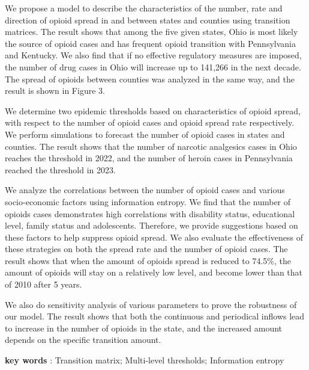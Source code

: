 \documentclass[13pt]{ctexart}
\begin{document}
\begin{adjustwidth}{1cm}{1cm}
\indent { }{ }{ }{ }{ }{ }We propose a model to describe the characteristics of the number, rate and direction of opioid spread in and between states and counties using transition matrices. The result shows that among the five given states, Ohio is most likely the source of opioid cases and has frequent opioid transition with Pennsylvania and Kentucky. We also find that if no effective regulatory measures are imposed, the number of drug cases in Ohio will increase up to 141,266 in the next decade. The spread of opioids between counties was analyzed in the same way, and the result is shown in Figure 3.

We determine two epidemic thresholds based on characteristics of opioid spread, with respect to the number of opioid cases and opioid spread rate respectively. We perform simulations to forecast the number of opioid cases in states and counties. The result shows that the number of narcotic analgesics cases in Ohio reaches the threshold in 2022, and the number of heroin cases in Pennsylvania reached the threshold in 2023.

We analyze the correlations between the number of opioid cases and various socio-economic factors using information entropy. We find that the number of opioids cases demonstrates high correlations with disability status, educational level, family status and adolescents. Therefore, we provide suggestions based on these factors to help suppress opioid spread. We also evaluate the effectiveness of these strategies on both the spread rate and the number of opioid cases. The result shows that when the amount of opioids spread is reduced to 74.5\%, the amount of opioids will stay on a relatively low level, and become lower than that of 2010 after 5 years.

We also do sensitivity analysis of various parameters to prove the robustness of our model. The result shows that both the continuous and periodical inflows lead to increase in the number of opioids in the state, and the increased amount depends on the specific transition amount.

\vspace{15pt}
\textbf{key words} : Transition matrix; Multi-level thresholds; Information entropy
\end{adjustwidth} 

\setmainfont{TeX Gyre Pagella}
\newpage
{}
\thispagestyle{empty}
\end{document}
